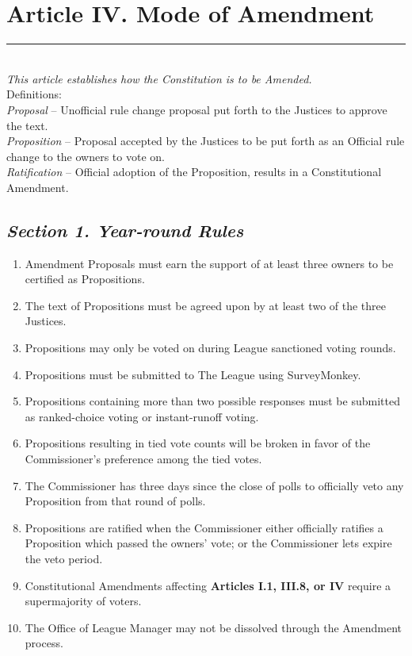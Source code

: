 \documentclass{article}
\begin{document}
\section{Article IV. Mode of Amendment}
    \noindent\rule{\textwidth}{0.5pt}\\

    \textit{This article establishes how the Constitution is to be Amended.}\\

    \noindent Definitions:\\
    \textit{Proposal} – Unofficial rule change proposal put forth to the Justices to approve the text.\\
    \textit{Proposition} – Proposal accepted by the Justices to be put forth as an Official rule change to the owners to vote on.\\
    \textit{Ratification} – Official adoption of the Proposition, results in a Constitutional Amendment.
    \subsection{\textit{Section 1. Year-round Rules}}
    \begin{enumerate}[label=\Alph*)]
        \item Amendment Proposals must earn the support of at least three owners to be certified as Propositions.
        \item The text of Propositions must be agreed upon by at least two of the three Justices.
        \item Propositions may only be voted on during League sanctioned voting rounds.
        \item Propositions must be submitted to The League using SurveyMonkey.
        \item Propositions containing more than two possible responses must be submitted as ranked-choice voting or instant-runoff voting.
        \item Propositions resulting in tied vote counts will be broken in favor of the Commissioner’s preference among the tied votes.
        \item The Commissioner has three days since the close of polls to officially veto any Proposition from that round of polls.
        \item Propositions are ratified when the Commissioner either officially ratifies a Proposition which passed the owners’ vote; or the Commissioner lets expire the veto period.
        \item Constitutional Amendments affecting \textbf{Articles I.1, III.8, or IV} require a supermajority of voters.
        \item The Office of League Manager may not be dissolved through the Amendment process.
    \end{enumerate}
\end{document}
